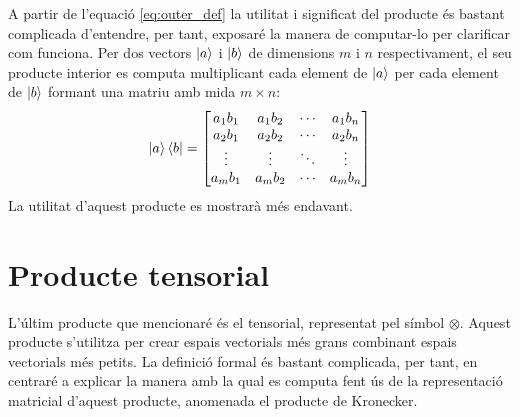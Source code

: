 A partir de l'equació \eqref{eq:outer_def} la utilitat i significat del producte és bastant complicada d'entendre, per tant, exposaré la manera de computar-lo per clarificar com funciona. Per dos vectors $\ket{a}$ i $\ket{b}$ de dimensions $m$ i $n$ respectivament, el seu producte interior es computa multiplicant cada element de $\ket{a}$ per cada element de $\ket{b}$ formant una matriu amb mida $m\times n$:
$$
\ket{a}\bra{b} = \begin{bmatrix}
	a_1 b_1 & a_1 b_2 & \cdots & a_1 b_n \\
	a_2 b_1 & a_2 b_2 & \cdots & a_2 b_n \\
	\vdots  & \vdots  & \ddots& \vdots  \\
	a_m b_1 & a_m b_2 & \cdots & a_m b_n \\
\end{bmatrix}
$$
La utilitat d'aquest producte es mostrarà més endavant.

\section{Producte tensorial}
L'últim producte que mencionaré és el tensorial, representat pel símbol $\otimes$. Aquest producte s'utilitza per crear espais vectorials més grans combinant espais vectorials més petits. La definició formal és bastant complicada, per tant, en centraré a explicar la manera amb la qual es computa fent ús de la representació matricial d'aquest producte, anomenada el producte de Kronecker.

